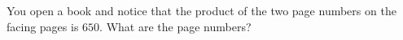 You open a book and notice that the product of the two page numbers on the facing pages is $650$. What are the page numbers?
